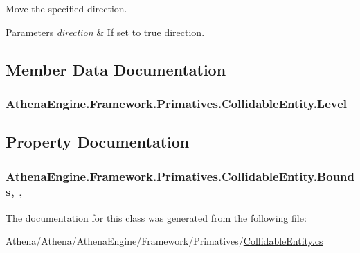 Move the specified direction. 


\begin{DoxyParams}{Parameters}
{\em direction} & If set to {\ttfamily true} direction. \\
\hline
\end{DoxyParams}


\subsection{Member Data Documentation}
\hypertarget{class_athena_engine_1_1_framework_1_1_primatives_1_1_collidable_entity_a3ea8e55331d01362ada8ca0a85c88a69}{
\subsubsection[{Level}]{ Athena\-Engine.\-Framework.\-Primatives.\-Collidable\-Entity.\-Level}}\label{class_athena_engine_1_1_framework_1_1_primatives_1_1_collidable_entity_a3ea8e55331d01362ada8ca0a85c88a69}


\subsection{Property Documentation}
\hypertarget{class_athena_engine_1_1_framework_1_1_primatives_1_1_collidable_entity_ae53970f6a2236ffa67eeb34146b3447c}{
\subsubsection[{Bounds}]{ Athena\-Engine.\-Framework.\-Primatives.\-Collidable\-Entity.\-Bounds\hspace{0.3cm}{\ttfamily [get]}, {\ttfamily [set]}, {\ttfamily [protected]}}}\label{class_athena_engine_1_1_framework_1_1_primatives_1_1_collidable_entity_ae53970f6a2236ffa67eeb34146b3447c}


The documentation for this class was generated from the following file\-:\begin{DoxyCompactItemize}
\item 
Athena/\-Athena/\-Athena\-Engine/\-Framework/\-Primatives/\hyperlink{_collidable_entity_8cs}{Collidable\-Entity.\-cs}\end{DoxyCompactItemize}
